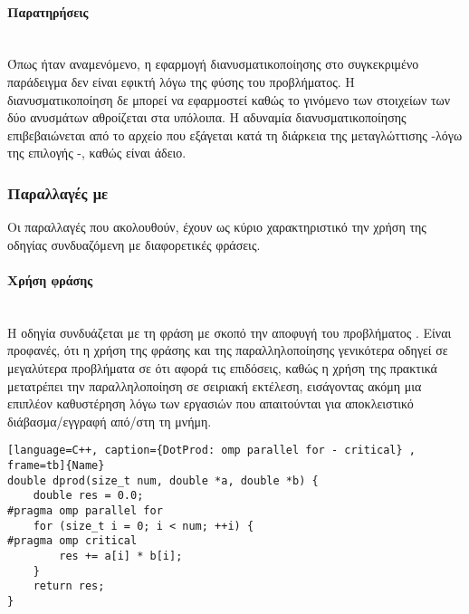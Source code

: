 \paragraph{Παρατηρήσεις}
\ \\
Όπως ήταν αναμενόμενο, η εφαρμογή διανυσματικοποίησης στο συγκεκριμένο παράδειγμα δεν είναι εφικτή λόγω της φύσης του προβλήματος. Η διανυσματικοποίηση δε μπορεί να εφαρμοστεί καθώς το γινόμενο των στοιχείων των δύο ανυσμάτων αθροίζεται στα υπόλοιπα. Η αδυναμία διανυσματικοποίησης επιβεβαιώνεται από το αρχείο  που εξάγεται κατά τη διάρκεια της μεταγλώττισης -λόγω της επιλογής -, καθώς είναι άδειο.

\clearpage
\subsubsection{Παραλλαγές με }
Οι παραλλαγές που ακολουθούν, έχουν ως κύριο χαρακτηριστικό την χρήση της οδηγίας 
συνδυαζόμενη με διαφορετικές φράσεις.

\paragraph{Χρήση φράσης }\mbox{} \\
Η οδηγία  συνδυάζεται με τη φράση  με σκοπό την αποφυγή του προβλήματος . Είναι προφανές, ότι η χρήση της φράσης  και της παραλληλοποίησης γενικότερα οδηγεί σε μεγαλύτερα προβλήματα σε ότι αφορά τις επιδόσεις, καθώς η χρήση της πρακτικά μετατρέπει την παραλληλοποίηση σε σειριακή εκτέλεση, εισάγοντας ακόμη μια επιπλέον καθυστέρηση λόγω των εργασιών που απαιτούνται για αποκλειστικό διάβασμα/εγγραφή  από/στη τη μνήμη.
\begin{spacing}{1.0}
\begin{lstlisting}[language=C++, caption={DotProd: omp parallel for - critical} , frame=tb]{Name}
double dprod(size_t num, double *a, double *b) {
    double res = 0.0;
#pragma omp parallel for
    for (size_t i = 0; i < num; ++i) {
#pragma omp critical
        res += a[i] * b[i];
    }
    return res;
}
\end{lstlisting}
\end{spacing}


